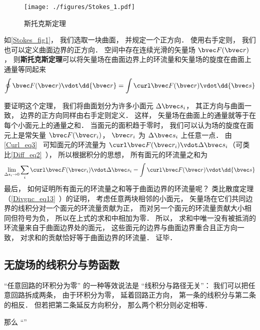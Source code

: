 
\begin{issues}
\issueTODO
\end{issues}


\begin{figure}[ht]
\centering
\texttt{[image: ./figures/Stokes\_1.pdf]}
\caption{斯托克斯定理} \label{Stokes_fig1}
\end{figure}

如\autoref{Stokes_fig1}， 我们选取一块曲面， 并规定一个正方向． 使用右手定则， 我们也可以定义曲面边界的正方向． 空间中存在连续光滑的矢量场 $\bvec F(\bvec r)$， 则\textbf{斯托克斯定理}可以将矢量场在曲面边界上的环流量和矢量场的旋度在曲面上通量等同起来
\begin{equation}\label{Stokes_eq1}
\oint \bvec F(\bvec r) \vdot \dd{\bvec r} = \int \curl \bvec F(\bvec r) \vdot \dd{\bvec s}
\end{equation}


要证明这个定理， 我们将曲面划分为许多小面元 $\Delta \bvec s_i$， 其正方向与曲面一致， 边界的正方向同样由右手定则定义． 这样， 矢量场在曲面上的通量就等于在每个小面元上的通量之和． 当面元的面积趋于零时， 我们可以认为场的旋度在面元上是常矢量 $\bvec F(\bvec r_i)$， $\bvec r_i$ 为 $\Delta \bvec s_i$ 上任意一点． 由\autoref{Curl_eq3}~ 可知面元的环流量为 $\curl\bvec F(\bvec r_i) \vdot \Delta \bvec s_i$（可类比\autoref{Diff_eq2}~）， 所以根据积分的思想， 所有面元的环流量之和为
\begin{equation}
\lim_{\Delta s_i \to 0}\sum_i \curl\bvec F(\bvec r_i) \vdot \Delta \bvec s_i = \int \curl\bvec F(\bvec r) \vdot \dd{\bvec s}
\end{equation}
最后， 如何证明所有面元的环流量之和等于曲面边界的环流量呢？ 类比散度定理（\autoref{Divgnc_eq13}~）的证明， 考虑任意两块相邻的小面元， 矢量场在它们共同边界的线积分对一个面元的环流量贡献为正， 而对另一个面元的环流量贡献大小相同但符号为负， 所以在上式的求和中相加为零． 所以， 求和中唯一没有被抵消的环流量来自于曲面边界处的面元， 这些面元的边界与曲面边界重合且正方向一致， 对求和的贡献恰好等于曲面边界的环流量． 证毕．


\subsection{无旋场的线积分与势函数}
“任意回路的环积分为零” 的一种等效说法是 “线积分与路径无关”： 我们可以把任意回路拆成两条， 由于环积分为零， 延着回路正方向， 第一条的线积分与第二条的相反． 但若把第二条延反方向积分， 那么两个积分则必定相等．

那么 “”
